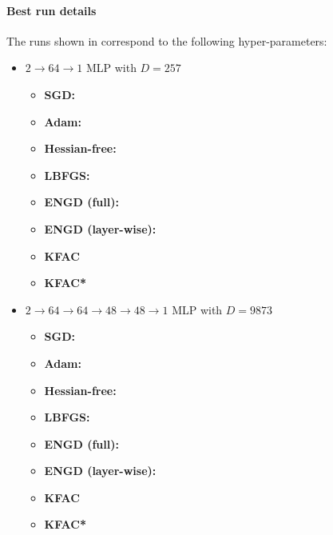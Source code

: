 \paragraph{Best run details}
The runs shown in  correspond to the following hyper-parameters:
\begin{itemize}
\item $2\to 64\to 1$ MLP with $D=257$
  \begin{itemize}
    \def\pathToRuns{../kfac_pinns_exp/exp09_reproduce_poisson2d/tex}
  \item \textbf{SGD:} 
  \item \textbf{Adam:} 
  \item \textbf{Hessian-free:} 
  \item \textbf{LBFGS:} 
  \item \textbf{ENGD (full):} 
  \item \textbf{ENGD (layer-wise):} 
  \item \textbf{KFAC} 
  \item \textbf{KFAC*} 
  \end{itemize}

\item $2 \to 64 \to 64 \to 48 \to 48 \to 1$ MLP with $D=\num{9873}$
  \begin{itemize}
    \def\pathToRuns{../kfac_pinns_exp/exp15_poisson2d_deepwide/tex}
  \item \textbf{SGD:} 
  \item \textbf{Adam:} 
  \item \textbf{Hessian-free:} 
  \item \textbf{LBFGS:} 
  \item \textbf{ENGD (full):} 
  \item \textbf{ENGD (layer-wise):} 
  \item \textbf{KFAC} 
  \item \textbf{KFAC*} 
  \end{itemize}


\end{itemize}
